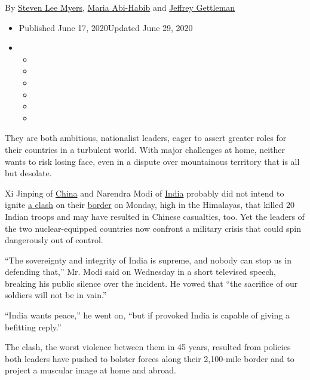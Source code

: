 By \href{https://www.nytimes.com/by/steven-lee-myers}{Steven Lee Myers},
\href{https://www.nytimes.com/by/maria-abi-habib}{Maria Abi-Habib} and
\href{https://www.nytimes.com/by/jeffrey-gettleman}{Jeffrey Gettleman}

\begin{itemize}
\item
  Published June 17, 2020Updated June 29, 2020
\item
  \begin{itemize}
  \item
  \item
  \item
  \item
  \item
  \item
  \end{itemize}
\end{itemize}

They are both ambitious, nationalist leaders, eager to assert greater
roles for their countries in a turbulent world. With major challenges at
home, neither wants to risk losing face, even in a dispute over
mountainous territory that is all but desolate.

Xi Jinping of
\href{https://www.nytimes.com/2020/06/29/world/asia/tik-tok-banned-india-china.html}{China}
and Narendra Modi of
\href{https://www.nytimes.com/2020/06/29/world/asia/tik-tok-banned-india-china.html}{India}
probably did not intend to ignite
\href{https://www.nytimes.com/2020/06/16/world/asia/indian-china-border-clash.html}{a
clash} on their
\href{https://www.nytimes.com/2020/06/18/world/asia/india-china-border.html}{border}
on Monday, high in the Himalayas, that killed 20 Indian troops and may
have resulted in Chinese casualties, too. Yet the leaders of the two
nuclear-equipped countries now confront a military crisis that could
spin dangerously out of control.

``The sovereignty and integrity of India is supreme, and nobody can stop
us in defending that,'' Mr. Modi said on Wednesday in a short televised
speech, breaking his public silence over the incident. He vowed that
``the sacrifice of our soldiers will not be in vain.''

``India wants peace,'' he went on, ``but if provoked India is capable of
giving a befitting reply.''

The clash, the worst violence between them in 45 years, resulted from
policies both leaders have pushed to bolster forces along their
2,100-mile border and to project a muscular image at home and abroad.

